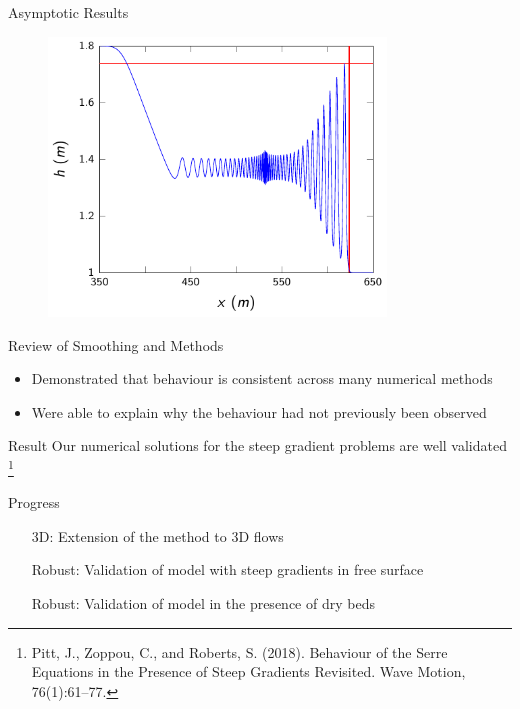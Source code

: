 \documentclass[handout]{beamer}
\begin{document}
\begin{frame}{Asymptotic Results}
	\begin{figure}
		\includegraphics[width=0.8\textwidth]{./Pics/SteepGradients/DSWap1.pdf}
	\end{figure}
\end{frame}

\begin{frame}{Review of Smoothing and Methods}
	\begin{itemize}
		\item Demonstrated that behaviour is consistent across many numerical methods
		\item Were able to explain why the behaviour had not previously been observed
	\end{itemize}
\end{frame}

\begin{frame}{Result}
	Our numerical solutions for the steep gradient problems are well validated \footnote{Pitt, J., Zoppou, C., and Roberts, S. (2018).
		Behaviour of the Serre Equations in the Presence of Steep
		Gradients Revisited.
		Wave Motion, 76(1):61–77.}
\end{frame}

\begin{frame}{Progress}
	\begin{itemize}
		\item[3D:] Extension of the method to 3D flows  \checkmark
		\item[Robust:] Validation of model with steep gradients in free surface \checkmark 
		\item[Robust:] Validation of model in the presence of dry beds 
	\end{itemize}
\end{frame}
\end{document}
